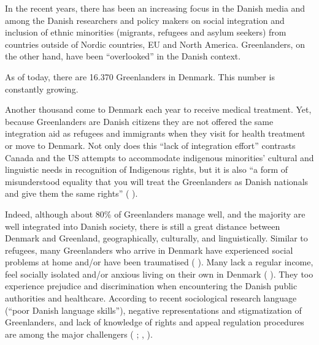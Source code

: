 \documentclass[twocolumn, issue, rga, authordate]{jote-new-article}
\begin{document}
In the recent years, there has been an increasing focus in the Danish media and among the Danish researchers and policy makers on social integration and inclusion of ethnic minorities (migrants, refugees and asylum seekers) from countries outside of Nordic countries, EU and North America. Greenlanders, on the other hand, have been ``overlooked'' in the Danish context.

As of today, there are 16.370 Greenlanders in Denmark. This number is constantly growing.

Another thousand come to Denmark each year to receive medical treatment.
Yet, because Greenlanders are Danish citizens they are not offered the same integration aid as refugees and immigrants when they visit for health treatment or move to Denmark. Not only does this ``lack of integration effort'' contrasts Canada and the US attempts to accommodate indigenous minorities' cultural and linguistic needs in recognition of Indigenous rights, but it is also ``a form of misunderstood equality that you will treat the Greenlanders as Danish nationals and give them the same rights'' ( \citeyear{Toft2018}).

Indeed, although about 80\% of Greenlanders manage well, and the majority are well integrated into Danish society, there is still a great distance between Denmark and Greenland, geographically, culturally, and linguistically. Similar to refugees, many Greenlanders who arrive in Denmark have experienced social problems at home and/or have been traumatised ( \citeyear{laage-petersen2015}). Many lack a regular income, feel socially isolated and/or anxious living on their own in Denmark
( \citeyear{Socialministeriet2003}). They too experience prejudice and discrimination when encountering the Danish public authorities and healthcare. According to recent sociological research language (``poor Danish language skills''), negative representations and stigmatization of Greenlanders, and lack of knowledge of rights and appeal regulation procedures are among the major challengers ( \citeyear{laage-petersen2015}; , \citeyear{Togeby2004}).
\end{document}
